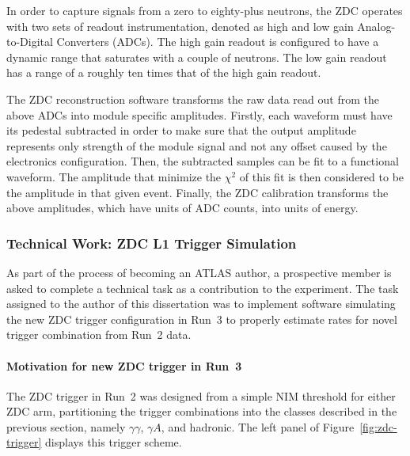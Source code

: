 In order to capture signals from a zero to eighty-plus neutrons, the ZDC operates with two sets of readout instrumentation, denoted as high and low gain Analog-to-Digital Converters (ADCs).  The high gain readout is configured to have a dynamic range that saturates with a couple of neutrons.  The low gain readout has a range of a roughly ten times that of the high gain readout.

The ZDC reconstruction software transforms the raw data read out from the above ADCs into module specific amplitudes.
Firstly, each waveform must have its pedestal subtracted in order to make sure that the output amplitude represents only strength of the module signal and not any offset caused by the electronics configuration.  Then, the subtracted samples can be fit to a functional waveform.  The amplitude that minimize the $\chi^2$ of this fit is then considered to be the amplitude in that given event.
Finally, the ZDC calibration transforms the above amplitudes, which have units of ADC counts, into units of energy.


\FloatBarrier
\subsubsection{Technical Work: ZDC L1 Trigger Simulation}
As part of the process of becoming an ATLAS author, a prospective member is asked to complete a technical task as a contribution to the experiment.
The task assigned to the author of this dissertation was to implement software simulating the new ZDC trigger configuration in Run~3 to properly estimate rates for novel trigger combination from Run~2 data.

\paragraph{Motivation for new ZDC trigger in Run~3}
The ZDC trigger in Run~2 was designed from a simple NIM threshold for either ZDC arm, partitioning the trigger combinations into the classes described in the previous section, namely $\gamma \gamma$, $\gamma A$, and hadronic. The left panel of Figure~\ref{fig:zdc-trigger} displays this trigger scheme.

